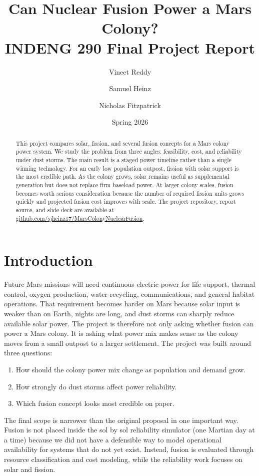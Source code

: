 \documentclass[11pt]{article}
\title{Can Nuclear Fusion Power a Mars Colony?\\INDENG 290 Final Project Report}
\author{Vineet Reddy \and Samuel Heinz \and Nicholas Fitzpatrick}
\date{Spring 2026}
\begin{document}
\maketitle

\begin{abstract}
This project compares solar, fission, and several fusion concepts for a Mars colony power system. We study the problem from three angles: feasibility, cost, and reliability under dust storms. The main result is a staged power timeline rather than a single winning technology. For an early low population outpost, fission with solar support is the most credible path. As the colony grows, solar remains useful as supplemental generation but does not replace firm baseload power. At larger colony scales, fusion becomes worth serious consideration because the number of required fission units grows quickly and projected fusion cost improves with scale. The project repository, report source, and slide deck are available at \href{https://github.com/sjheinz17/MarsColonyNuclearFusion}{github.com/sjheinz17/MarsColonyNuclearFusion}.
\end{abstract}

\section{Introduction}

Future Mars missions will need continuous electric power for life support, thermal control, oxygen production, water recycling, communications, and general habitat operations. That requirement becomes harder on Mars because solar input is weaker than on Earth, nights are long, and dust storms can sharply reduce available solar power. The project is therefore not only asking whether fusion can power a Mars colony. It is asking what power mix makes sense as the colony moves from a small outpost to a larger settlement. The project was built around three questions:

\begin{enumerate}
    \item How should the colony power mix change as population and demand grow.
    \item How strongly do dust storms affect power reliability.
    \item Which fusion concept looks most credible on paper.
\end{enumerate}

The final scope is narrower than the original proposal in one important way. Fusion is not placed inside the sol by sol reliability simulator (one Martian day at a time) because we did not have a defensible way to model operational availability for systems that do not yet exist. Instead, fusion is evaluated through resource classification and cost modeling, while the reliability work focuses on solar and fission.
\end{document}
